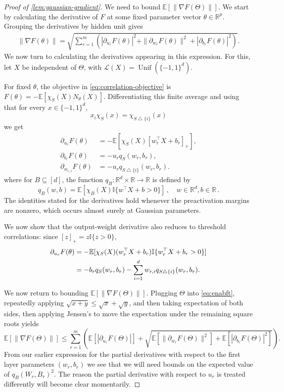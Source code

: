 \documentclass[11pt,twoside]{article}
\newcommand{\E}{\mathbb E}
\newcommand{\I}{\mathbb I}
\newcommand{\Law}{\mathcal L}
\newcommand{\R}{\mathbb R}
\theoremstyle{definition}
\theoremstyle{remark}
\begin{document}
\begin{proof}[Proof of \cref{lem:gaussian-gradient}]
We need to bound $\E[\|\nabla F(\Theta)\|]$.
We start by calculating the derivative of $F$ at some fixed parameter vector $\theta\in \R^p$.
Grouping the derivatives by hidden unit gives
\begin{align}
\|\nabla F(\theta)\|
=\sqrt{\sum_{r=1}^m\left(
|\partial_{u_r}F(\theta)|^2+
\|\partial_{w_r}F(\theta)\|^2+
|\partial_{b_r}F(\theta)|^2\right)}.
\label{eq:enabft}
\end{align}
We now turn to calculating the derivatives appearing in this expression.
For this, let $X$ be independent of $\Theta$, with
$\Law(X)=\operatorname{Unif}(\{-1,1\}^d)$.

For fixed $\theta$, the objective in \cref{eq:correlation-objective} is
$F(\theta)=-\E[\chi_S(X)N_\theta(X)]$.
Differentiating this finite average and using
that for every
$x\in\{-1,1\}^d$,
\[
x_i\chi_S(x)=\chi_{S\mathbin\triangle\{i\}}(x)
\]
we get
\begin{align}
\partial_{u_r}F(\theta)
&=-\E[\chi_S(X)[w_r^\top X+b_r]_+],
\label{eq:u-derivative}\\
\partial_{b_r}F(\theta)
&=-u_rq_S(w_r,b_r),
\label{eq:b-derivative}\\
\partial_{w_{r,i}}F(\theta)
&=-u_rq_{S\mathbin\triangle\{i\}}(w_r,b_r).
\label{eq:w-derivative}
\end{align}
where
for $B\subseteq[d]$,
the function $q_B: \R^d\times \R \to \R$ is defined by
\begin{equation}
q_B(w,b)=\E[\chi_B(X)\I\{w^\top X+b>0\}]\,, \quad w\in \R^d, b\in \R\,.
\label{eq:threshold-coefficient}
\end{equation}
The identities stated for the
derivatives hold whenever the preactivation margins are nonzero, which
occurs almost surely at Gaussian parameters.

We now show that the output-weight derivative
also reduces to threshold correlations: since $[z]_+=z\I\{z>0\}$,
\begin{align}
\partial_{u_r}F(\theta)
&=-\E[\chi_S(X)(w_r^\top X+b_r)
                 \I\{w_r^\top X+b_r>0\}]\notag\\
&=-b_rq_S(w_r,b_r)
-\sum_{i=1}^dw_{r,i}q_{S\mathbin\triangle\{i\}}(w_r,b_r).
\label{eq:u-expansion}
\end{align}


We now return to bounding $\E[\|\nabla F(\Theta)\|]$.
Plugging $\Theta$ into \cref{eq:enabft},
repeatedly applying $\sqrt{x+y}\le\sqrt x+\sqrt y$,
and then taking expectation of both sides,
then applying Jensen's to move the expectation under the remaining
square roots yields
\begin{equation}
\E[\|\nabla F(\Theta)\|]
\le\sum_{r=1}^m\left(
\E[|\partial_{u_r}F(\Theta)|]
+\sqrt{\E[\|\partial_{w_r}F(\Theta)\|^2]
+\E[|\partial_{b_r}F(\Theta)|^2]}
\right).
\label{eq:gradient-decomposition}
\end{equation}
From our earlier expression for the partial derivatives with respect to
the first layer parameters $(w_r,b_r)$ we see that we will need bounds on the
expected value of $q_B(W_r,B_r)^2$. The reason the partial derivative
with respect to $u_r$ is treated differently will become clear momentarily.


\end{proof}
\end{document}
